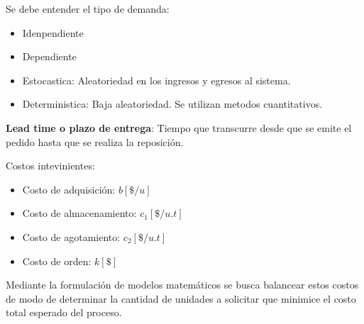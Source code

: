 \documentclass{article}
\begin{document}
Se debe entender el tipo de demanda:

\begin{itemize}
    \item Idenpendiente
    \item Dependiente
    \item Estocastica: Aleatoriedad en los ingresos y egresos al sistema.
    \item Deterministica: Baja aleatoriedad. Se utilizan metodos cuantitativos.
\end{itemize}

\textbf{Lead time o plazo de entrega}: Tiempo que transcurre desde que se emite el pedido hasta que se realiza la reposición.

Costos intevinientes:

\begin{itemize}
    \item Costo de adquisición: \(b[\$/u]\)
    \item Costo de almacenamiento: \(c_1[\$/u.t]\)
    \item Costo de agotamiento: \(c_2[\$/u.t]\)
    \item Costo de orden: \(k[\$]\)
\end{itemize}

Mediante la formulación de modelos matemáticos se busca balancear estos costos de modo 
de determinar la cantidad de unidades a solicitar que minimice el costo total esperado del proceso.
\end{document}
